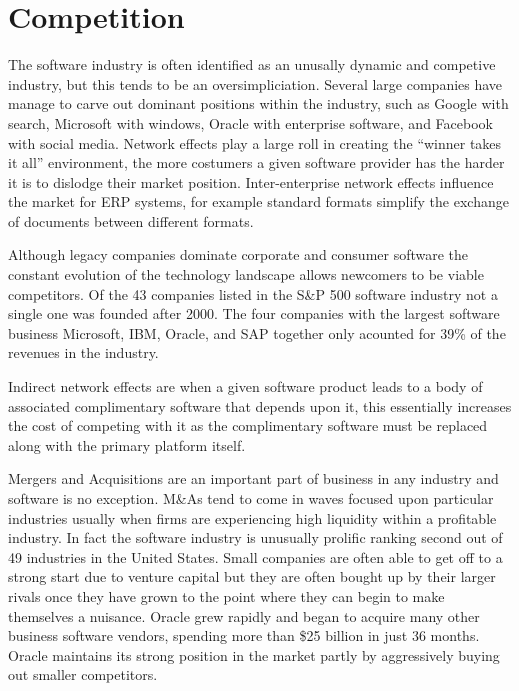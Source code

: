\section*{Competition}

The software industry is often identified as an unusally dynamic and competive industry, but this tends to be an oversimpliciation. Several large companies have manage to carve out dominant positions within the industry, such as Google with search, Microsoft with windows, Oracle with enterprise software, and Facebook with social media.\autocite[34]{IndustrySurveysInternet}
Network effects play a large roll in creating the ``winner takes it all'' environment, the more costumers a given software provider has the harder it is to dislodge their market position.\autocite[21]{buxmann2012software}
Inter-enterprise network effects influence the market for ERP systems, for example standard formats simplify the exchange of documents between different formats.\autocite[21]{buxmann2012software}

Although legacy companies dominate corporate and consumer software the constant evolution of the technology landscape allows newcomers to be viable competitors.\autocite[38]{SurveysSoftware2015}
Of the 43 companies listed in the S\&P 500 software industry not a single one was founded after 2000.\autocite[38]{SurveysSoftware2015}
The four companies with the largest software business Microsoft, IBM, Oracle, and SAP together only acounted for 39\% of the revenues in the industry.\autocite[38]{SurveysSoftware2015}

Indirect network effects are when a given software product leads to a body of associated complimentary software that depends upon it, this essentially increases the cost of competing with it as the complimentary software must be replaced along with the primary platform itself.\autocite[21]{buxmann2012software}

Mergers and Acquisitions are an important part of business in any industry and software is no exception.\autocite[421]{schief2013mergers}
M\&As tend to come in waves focused upon particular industries usually when firms are experiencing high liquidity within a profitable industry.\autocite[421]{schief2013mergers}
In fact the software industry is unusually prolific ranking second out of 49 industries in the United States.\autocite[421]{schief2013mergers}
Small companies are often able to get off to a strong start due to venture capital but they are often bought up by their larger rivals once they have grown to the point where they can begin to make themselves a nuisance. \autocite[]{LargeParadigmShiftCloudComputing}
Oracle grew rapidly and began to acquire many other business software vendors, spending more than \$25 billion in just 36 months.\autocite[114]{finkle2012larry}
Oracle maintains its strong position in the market partly by aggressively buying out smaller competitors.\autocite[121]{finkle2012larry}


